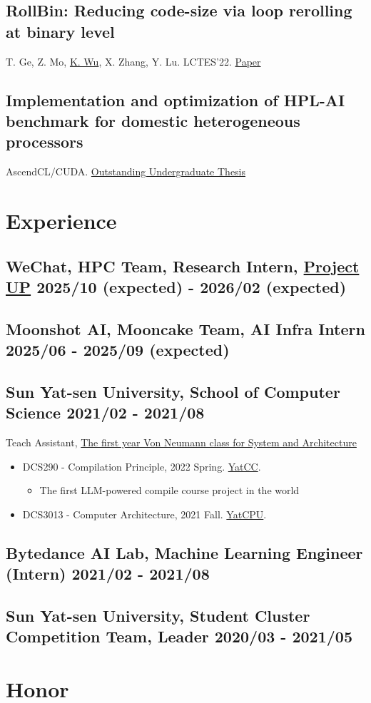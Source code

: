 \documentclass[
    scheme=plain
]{ctexart}
\newcommand{\datedsubsection}[2]{%
\subsection[#1]{#1 \hfill #2}
}
\begin{document}
\datedsubsection{\textbf{RollBin: Reducing code-size via loop rerolling at binary level}}{}

T. Ge, Z. Mo, \underline{K. Wu}, X. Zhang, Y. Lu. LCTES'22. \href{https://dl.acm.org/doi/10.1145/3519941.3535072}{Paper}

\datedsubsection{\textbf{Implementation and optimization of HPL-AI benchmark for domestic heterogeneous processors}}{}

AscendCL/CUDA. \href{https://wu-kan.cn/2021/03/14/HPL-AI/}{Outstanding Undergraduate Thesis}

\section{Experience}

\datedsubsection{\textbf{WeChat}, HPC Team, Research Intern, \href{https://mp.weixin.qq.com/s?__biz=MTkyNTM0MzA4MQ==&mid=2650961684&idx=1&sn=45c1e4c4da50169027a689a8c27effb5}{Project UP}}{2025/10 (expected) - 2026/02 (expected)}

\datedsubsection{\textbf{Moonshot AI}, Mooncake Team, AI Infra Intern}{2025/06 - 2025/09 (expected)}

\datedsubsection{\textbf{Sun Yat-sen University}, School of Computer Science}{2021/02 - 2021/08}

Teach Assistant, \href{https://cse.sysu.edu.cn/article/2314}{The first year Von Neumann class for System and Architecture}

\begin{itemize}
  \item DCS290 - Compilation Principle, 2022 Spring. \href{https://yatcc-ai.com/}{YatCC}.
    \begin{itemize}
        \item The first LLM-powered compile course project in the world
    \end{itemize}
  \item DCS3013 - Computer Architecture, 2021 Fall. \href{https://yatcpu.sysu.tech/}{YatCPU}.
\end{itemize}

\datedsubsection{\textbf{Bytedance AI Lab}, Machine Learning Engineer (Intern)}{2021/02 - 2021/08}

\datedsubsection{\textbf{Sun Yat-sen University}, Student Cluster Competition Team, Leader}{2020/03 - 2021/05}

\section{Honor}
\end{document}
